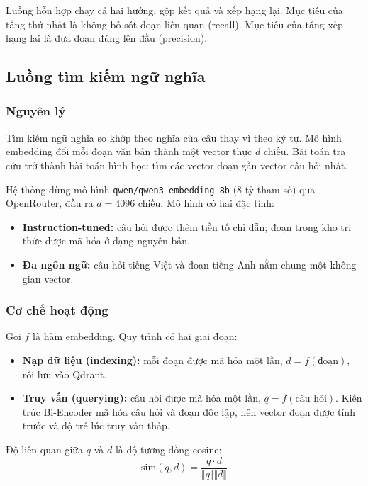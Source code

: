 Luồng hỗn hợp chạy cả hai hướng, gộp kết quả và xếp hạng lại. Mục tiêu của tầng thứ nhất là không bỏ sót đoạn liên quan (recall). Mục tiêu của tầng xếp hạng lại là đưa đoạn đúng lên đầu (precision).

\subsection{Luồng tìm kiếm ngữ nghĩa}

\subsubsection{Nguyên lý}

Tìm kiếm ngữ nghĩa so khớp theo nghĩa của câu thay vì theo ký tự. Mô hình embedding đổi mỗi đoạn văn bản thành một vector thực $d$ chiều. Bài toán tra cứu trở thành bài toán hình học: tìm các vector đoạn gần vector câu hỏi nhất.

Hệ thống dùng mô hình \texttt{qwen/qwen3-embedding-8b} (8 tỷ tham số) qua OpenRouter, đầu ra $d=4096$ chiều. Mô hình có hai đặc tính:
\begin{itemize}
  \item \textbf{Instruction-tuned:} câu hỏi được thêm tiền tố chỉ dẫn; đoạn trong kho tri thức được mã hóa ở dạng nguyên bản.
  \item \textbf{Đa ngôn ngữ:} câu hỏi tiếng Việt và đoạn tiếng Anh nằm chung một không gian vector.
\end{itemize}

\subsubsection{Cơ chế hoạt động}

Gọi $f$ là hàm embedding. Quy trình có hai giai đoạn:
\begin{itemize}
  \item \textbf{Nạp dữ liệu (indexing):} mỗi đoạn được mã hóa một lần, $d=f(\text{đoạn})$, rồi lưu vào Qdrant.
  \item \textbf{Truy vấn (querying):} câu hỏi được mã hóa một lần, $q=f(\text{câu hỏi})$. Kiến trúc Bi-Encoder mã hóa câu hỏi và đoạn độc lập, nên vector đoạn được tính trước và độ trễ lúc truy vấn thấp.
\end{itemize}

Độ liên quan giữa $q$ và $d$ là độ tương đồng cosine:
\begin{equation}
  \mathrm{sim}(q,d)=\frac{q\cdot d}{\Vert q\Vert \Vert d\Vert }
\end{equation}

